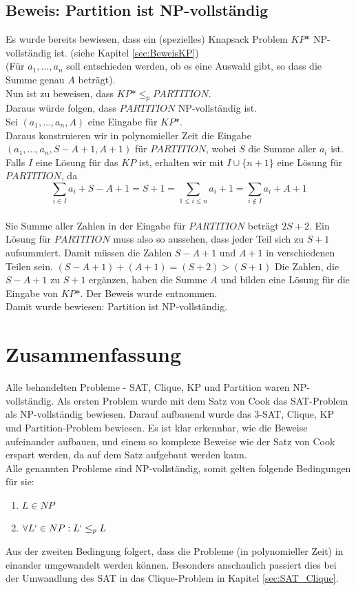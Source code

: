 \documentclass[ngerman]{article}
\begin{document}
\subsection{Beweis: Partition ist NP-vollständig}
Es wurde bereits bewiesen, dass ein (spezielles) Knapsack Problem \(KP\mbox{*}\) NP-vollständig ist. (siehe Kapitel \vref{sec:BeweisKP})\\
(Für \(a_1,...,a_n\) soll entschieden werden, ob es eine Auswahl gibt, so dass die Summe genau \(A\) beträgt).\\
Nun ist zu beweisen, dass \(KP\mbox{*} \leq_p PARTITION\).\\
Daraus würde folgen, dass $PARTITION$ NP-vollständig ist.\\
Sei \((a_1,...,a_n,A)\) eine Eingabe für \(KP\mbox{*}\).\\
Daraus konstruieren wir in polynomieller Zeit die Eingabe\\
\((a_1,...,a_n,S-A+1,A+1)\) für \(PARTITION\), wobei \(S\) die Summe aller \(a_i\) ist.\\
Falls \(I\) eine Lösung für das \(KP\) ist, erhalten wir mit \(I \cup \{n+1\}\) eine Lösung für \(PARTITION\), da\\
$$\sum_{i \in I}a_i + S - A + 1 = S + 1 = \sum_{1 \le i \le n}a_i + 1 = \sum_{i \notin I}a_i + A + 1$$\\
Sie Summe aller Zahlen in der Eingabe für \(PARTITION\) beträgt \(2S + 2\).
Ein Lösung für \(PARTITION\) muss also so aussehen, dass jeder Teil sich zu \(S + 1\) aufsummiert.
Damit müssen die Zahlen \(S - A + 1\) und \(A + 1\) in verschiedenen Teilen sein.
\((S - A + 1) + (A + 1) = (S + 2) > (S + 1)\)
Die Zahlen, die \(S - A + 1\) zu \(S + 1\) ergänzen, haben die Summe \(A\) und bilden eine Lösung für die Eingabe von \(KP\mbox{*}\).
Der Beweis wurde \cite{wegener} entnommen.\\
Damit wurde bewiesen: Partition ist NP-vollständig.

\section{Zusammenfassung}
Alle behandelten Probleme - SAT, Clique, KP und Partition waren NP-vollständig.
Als ersten Problem wurde mit dem Satz von Cook das SAT-Problem als NP-vollständig bewiesen.
Darauf aufbauend wurde das 3-SAT, Clique, KP und Partition-Problem bewiesen.
Es ist klar erkennbar, wie die Beweise aufeinander aufbauen, und einem so komplexe Beweise wie der Satz von Cook erspart werden, da auf dem Satz aufgebaut werden kann.\\
Alle genannten Probleme sind NP-vollständig, somit gelten folgende Bedingungen für sie:
\begin{enumerate}
\item $L \in NP$
\item $\forall L` \in NP: L` \leq_p L$
\end{enumerate}
Aus der zweiten Bedingung folgert, dass die Probleme (in polynomieller Zeit) in einander umgewandelt werden können.
Besonders anschaulich passiert dies bei der Umwandlung des SAT in das Clique-Problem in Kapitel \vref{sec:SAT_Clique}.

\newpage
\def\refname{Literaturverzeichnis}
\printbibliography
\end{document}
